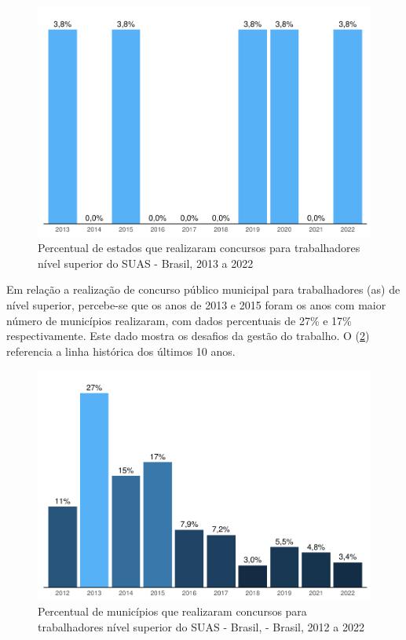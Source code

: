 \documentclass[
  brazilian]{report}
\begin{document}
\begin{figure}
\includegraphics{Censo-SUAS-2022_files/figure-latex/conc_estado-1} \caption[Percentual de estados que realizaram concursos para trabalhadores nível superior do SUAS - Brasil, 2013 a 2022]{Percentual de estados que realizaram concursos para trabalhadores nível superior do SUAS - Brasil, 2013 a 2022}\label{fig:conc_estado}
\end{figure}

Em relação a realização de concurso público municipal para trabalhadores
(as) de nível superior, percebe-se que os anos de 2013 e 2015 foram os
anos com maior número de municípios realizaram, com dados percentuais de
27\% e 17\% respectivamente. Este dado mostra os desafios da gestão do
trabalho. O (\cref{fig:conc_munic}) referencia a linha histórica dos
últimos 10 anos.

\begin{figure}
\includegraphics{Censo-SUAS-2022_files/figure-latex/conc_munic-1} \caption[Percentual de municípios que realizaram concursos para trabalhadores nível superior do SUAS - Brasil, - Brasil, 2012 a 2022]{Percentual de municípios que realizaram concursos para trabalhadores nível superior do SUAS - Brasil, - Brasil, 2012 a 2022}\label{fig:conc_munic}
\end{figure}
\end{document}
